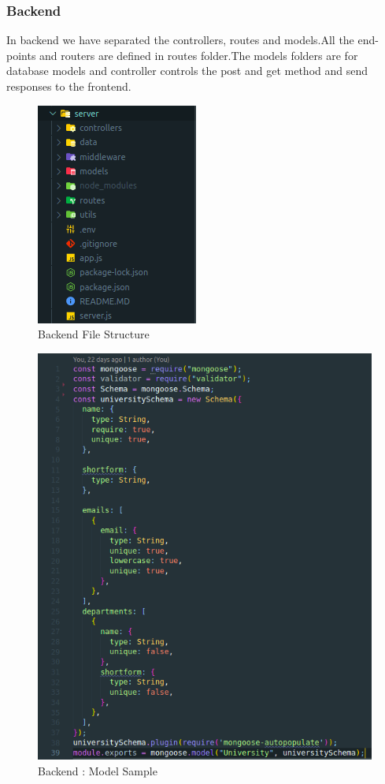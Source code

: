 \documentclass[10pt]{article}
\begin{document}
\subsubsection{Backend}

In backend we have separated the controllers, routes and models.All the end-points and routers are defined in routes folder.The models folders are for database models and controller controls the post and get method and send responses to the frontend.

\begin{figure}[H]
  \centering
  \centerline{\includegraphics[width=.5\textwidth]{backend.png}}
  \caption{Backend File Structure}
  \label{fig}
\end{figure}

\begin{figure}[H]
  \centering
  \centerline{\includegraphics[width=.6\textwidth]{model.png}}
  \caption{Backend : Model Sample}
  \label{fig}
\end{figure}
\end{document}

